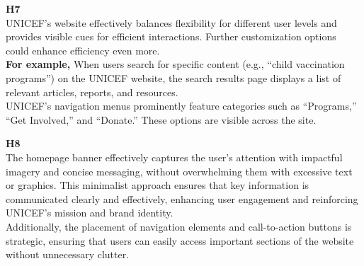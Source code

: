 \documentclass{article}
\begin{document}
\begin{description}
    \item {\textbf{H7} \color{unicefGray}{Flexibility and efficiency of use}}\\
    UNICEF’s website effectively balances flexibility for different user levels and provides visible cues for efficient interactions. Further customization options could enhance efficiency even more.\\
    \textbf{For example,} When users search for specific content (e.g., “child vaccination programs”) on the UNICEF website, the search results page displays a list of relevant articles, reports, and resources.\\
    UNICEF’s navigation menus prominently feature categories such as “Programs,” “Get Involved,” and “Donate.” These options are visible across the site.
\end{description}
\begin{description}
    \item {\textbf{H8} \color{unicefGray}{Aesthetic and minimalist design}}\\
    The homepage banner effectively captures the user's attention with impactful imagery and concise messaging, without overwhelming them with excessive text or graphics. This minimalist approach ensures that key information is communicated clearly and effectively, enhancing user engagement and reinforcing UNICEF's mission and brand identity.\\
    Additionally, the placement of navigation elements and call-to-action buttons is strategic, ensuring that users can easily access important sections of the website without unnecessary clutter.
\end{description}
\end{document}
